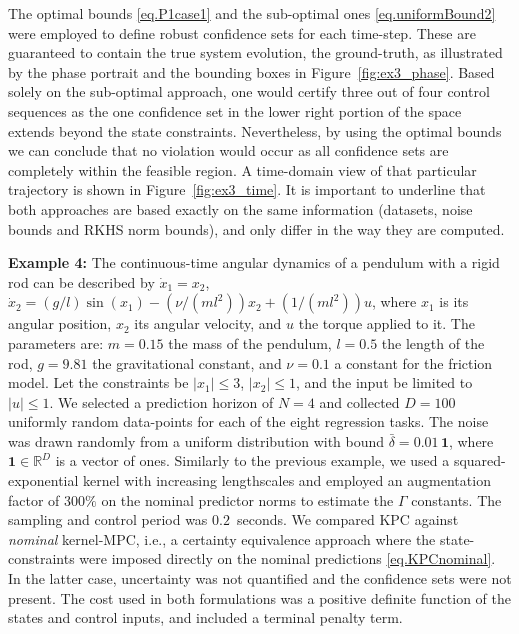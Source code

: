 The optimal bounds \eqref{eq.P1case1} and the sub-optimal ones \eqref{eq.uniformBound2} were employed to define robust confidence sets for each time-step. These are guaranteed to contain the true system evolution, the ground-truth, as illustrated by the phase portrait and the bounding boxes in Figure~\ref{fig:ex3_phase}. Based solely on the sub-optimal approach, one would certify three out of four control sequences as the one confidence set in the lower right portion of the space extends beyond the state constraints. Nevertheless, by using the optimal bounds we can conclude that no violation would occur as all confidence sets are completely within the feasible region. A time-domain view of that particular trajectory is shown in Figure~\ref{fig:ex3_time}. It is important to underline that both approaches are based exactly on the same information (datasets, noise bounds and RKHS norm bounds), and only differ in the way they are computed.

\textbf{Example 4:} The continuous-time angular dynamics of a pendulum with a rigid rod can be described by $\dot x_1 = x_2$, $\dot x_2 = (g/l)\sin(x_1) - (\nu/(ml^2)) x_2 + (1/(m l^2)) u$, where $x_1$ is its angular position, $x_2$ its angular velocity, and $u$ the torque applied to it. The parameters are: $m = 0.15$ the mass of the pendulum, $l = 0.5$ the length of the rod, $g = 9.81$ the gravitational constant, and $\nu = 0.1$ a constant for the friction model. Let the constraints be $\vert x_1 \vert \leq 3$, $\vert x_2 \vert \leq 1$, and the input be limited to $\vert u \vert \leq 1$. We selected a prediction horizon of $N=4$ and collected $D=100$ uniformly random data-points for each of the eight regression tasks. The noise was drawn randomly from a uniform distribution with bound $\bar \delta = 0.01 \, \textbf{1}$, where $\textbf{1} \in \mathbb{R}^D$ is a vector of ones. Similarly to the previous example, we used a squared-exponential kernel with increasing lengthscales and employed an augmentation factor of $300\%$ on the nominal predictor norms to estimate the $\Gamma$ constants. The sampling and control period was $0.2$~seconds. We compared KPC against \textit{nominal} kernel-MPC, i.e., a certainty equivalence approach where the state-constraints were imposed directly on the nominal predictions \eqref{eq.KPCnominal}. In the latter case, uncertainty was not quantified and the confidence sets were not present. The cost used in both formulations was a positive definite function of the states and control inputs, and included a terminal penalty term. 

